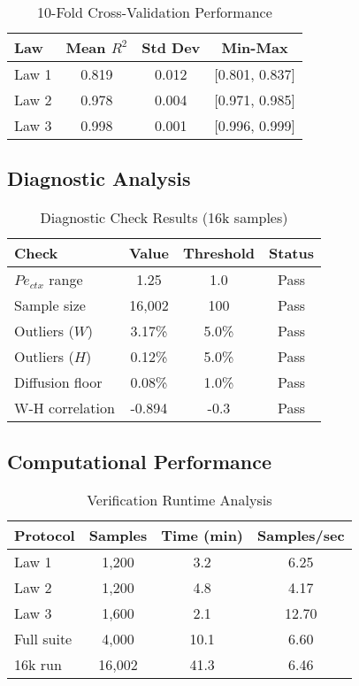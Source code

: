 \documentclass[conference]{IEEEtran}
\begin{document}
\begin{table}[h]
\centering
\caption{10-Fold Cross-Validation Performance}
\label{tab:cross_validation}
\begin{tabular}{@{}lccc@{}}
\toprule
Law & Mean $R^2$ & Std Dev & Min-Max \\
\midrule
Law 1 & 0.819 & 0.012 & [0.801, 0.837] \\
Law 2 & 0.978 & 0.004 & [0.971, 0.985] \\
Law 3 & 0.998 & 0.001 & [0.996, 0.999] \\
\bottomrule
\end{tabular}
\end{table}

\subsection{Diagnostic Analysis}

\begin{table}[h]
\centering
\caption{Diagnostic Check Results (16k samples)}
\label{tab:diagnostics}
\begin{tabular}{@{}lccc@{}}
\toprule
Check & Value & Threshold & Status \\
\midrule
$Pe_{ctx}$ range & 1.25 & 1.0 & Pass \\
Sample size & 16,002 & 100 & Pass \\
Outliers ($W$) & 3.17\% & 5.0\% & Pass \\
Outliers ($H$) & 0.12\% & 5.0\% & Pass \\
Diffusion floor & 0.08\% & 1.0\% & Pass \\
W-H correlation & -0.894 & -0.3 & Pass \\
\bottomrule
\end{tabular}
\end{table}

\subsection{Computational Performance}

\begin{table}[h]
\centering
\caption{Verification Runtime Analysis}
\label{tab:performance}
\begin{tabular}{@{}lccc@{}}
\toprule
Protocol & Samples & Time (min) & Samples/sec \\
\midrule
Law 1 & 1,200 & 3.2 & 6.25 \\
Law 2 & 1,200 & 4.8 & 4.17 \\
Law 3 & 1,600 & 2.1 & 12.70 \\
Full suite & 4,000 & 10.1 & 6.60 \\
16k run & 16,002 & 41.3 & 6.46 \\
\bottomrule
\end{tabular}
\end{table}
\end{document}

